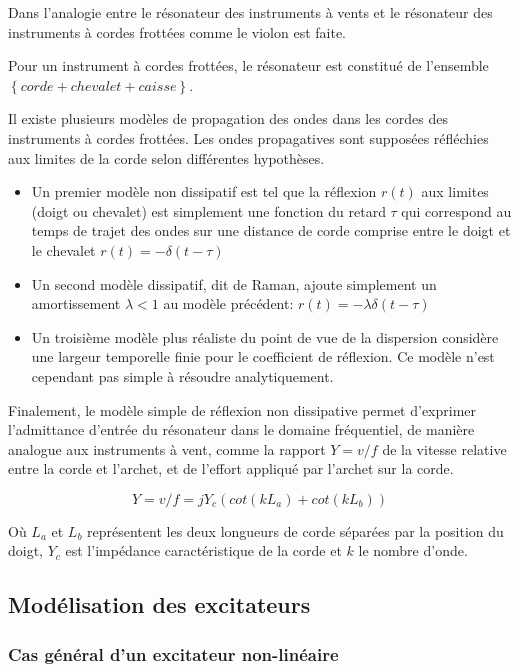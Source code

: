 \documentclass[atiam, article]{rapport} %
\begin{document}
Dans \cite{ollivier_idealized_2004} l'analogie entre le résonateur des instruments à vents et le résonateur des instruments à cordes frottées comme le violon est faite. 

Pour un instrument à cordes frottées, le résonateur est constitué de l'ensemble $\left\{ corde + chevalet + caisse\right\}$.

Il existe plusieurs modèles de propagation des ondes dans les cordes des instruments à cordes frottées. Les ondes propagatives sont supposées réfléchies aux limites de la corde selon différentes hypothèses.

\begin{itemize}
  \item Un premier modèle non dissipatif est tel que la réflexion $r(t)$ aux limites (doigt ou chevalet) est simplement une fonction du retard $\tau$ qui correspond au temps de trajet des ondes sur une distance de corde comprise entre le doigt et le chevalet $r(t)=-\delta(t-\tau)$
  \item Un second modèle dissipatif, dit de Raman, ajoute simplement un amortissement $\lambda < 1$ au modèle précédent: $r(t)=-\lambda \delta(t-\tau)$
  \item Un troisième modèle plus réaliste du point de vue de la dispersion  considère une largeur temporelle finie pour le coefficient de réflexion. Ce modèle n'est cependant pas simple à résoudre analytiquement.
\end{itemize}

Finalement, le modèle simple de réflexion non dissipative permet d'exprimer l'admittance d'entrée du résonateur dans le domaine fréquentiel, de manière analogue aux instruments à vent, comme la rapport $Y=v/f$ de la vitesse relative entre la corde et l'archet, et de l'effort appliqué par l'archet sur la corde.

$$Y=v/f=jY_c(cot(kL_a)+cot(kL_b))$$

Où $L_a$ et $L_b$ représentent les deux longueurs de corde séparées par la position du doigt, $Y_c$ est l'impédance caractéristique de la corde et $k$ le nombre d'onde.


\subsection{Modélisation des excitateurs}

\subsubsection{Cas général d'un excitateur non-linéaire}\label{subsubsection:excitateur_cas_général}
\end{document}
